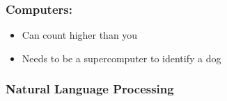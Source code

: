\documentclass{beamer}
\begin{document}
\begin{frame}
\frametitle{Computers:}

\begin{itemize}
  \item Can count higher than you
  \item Needs to be a supercomputer to identify a dog
\end{itemize}
\end{frame}

\begin{frame}
\frametitle{Natural Language Processing}

\end{frame}
\end{document}
